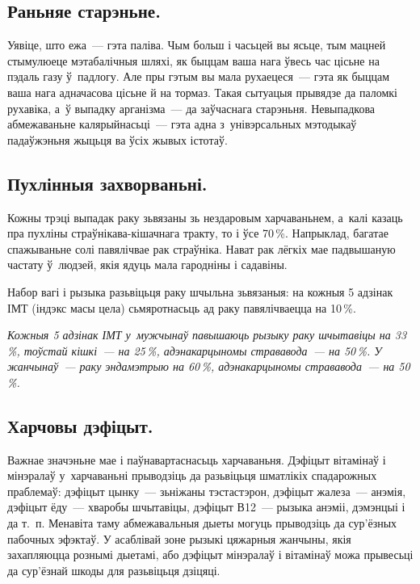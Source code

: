 
\subsection*{Раньняе старэньне.} 
Уявіце, што ежа~--- гэта паліва. Чым больш і часьцей вы ясьце, тым мацней стымулюеце мэтабалічныя шляхі, як быццам ваша нага ўвесь час цісьне на пэдаль газу ў~падлогу. Але пры гэтым вы мала рухаецеся~--- гэта як быццам ваша нага адначасова цісьне й на тормаз. Такая сытуацыя прывядзе да паломкі рухавіка, а~ў выпадку арганізма~--- да заўчаснага старэньня. Невыпадкова абмежаваньне калярыйнасьці~--- гэта адна з~унівэрсальных мэтодыкаў падаўжэньня жыцьця ва ўсіх жывых істотаў.

\subsection*{Пухлінныя захворваньні.} 
Кожны трэці выпадак раку зьвязаны зь нездаровым харчаваньнем, а~калі казаць пра пухліны страўнікава-кішачнага тракту, то і ўсе 70\,\%. Напрыклад, багатае спажываньне солі павялічвае рак страўніка. Нават рак лёгкіх мае падвышаную частату ў~людзей, якія ядуць мала гародніны і садавіны.

Набор вагі і рызыка разьвіцьця раку шчыльна зьвязаныя: на кожныя 5 адзінак ІМТ (індэкс масы цела) сьмяротнасьць ад раку павялічваецца на 10\,\%. 

\emph{Кожныя 5 адзінак ІМТ у~мужчынаў павышаюць рызыку раку шчытавіцы на 33\,\%, тоўстай кішкі~--- на 25\,\%, адэнакарцыномы стрававода~--- на 50\,\%. У жанчынаў~--- раку эндамэтрыю на 60\,\%, адэнакарцыномы стрававода~--- на 50\,\%.}

\subsection*{Харчовы дэфіцыт.} 

Важнае значэньне мае і паўнавартаснасьць харчаваньня. Дэфіцыт вітамінаў і мінэралаў у~харчаваньні прыводзіць да разьвіцьця шматлікіх спадарожных праблемаў: дэфіцыт цынку~--- зьніжаны тэстастэрон, дэфіцыт жалеза~--- анэмія, дэфіцыт ёду~--- хваробы шчытавіцы, дэфіцыт В12~--- рызыка анэміі, дэмэнцыі і да т.~п. Менавіта таму абмежавальныя дыеты могуць прыводзіць да сур'ёзных пабочных эфэктаў. У асаблівай зоне рызыкі цяжарныя жанчыны, якія захапляюцца рознымі дыетамі, або дэфіцыт мінэралаў і вітамінаў можа прывесьці да сур'ёзнай шкоды для разьвіцьця дзіцяці.


